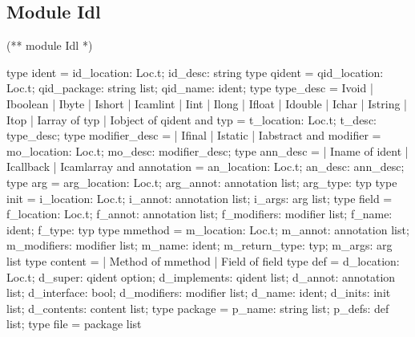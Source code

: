 \documentclass[a4paper, 11pt]{report}
\begin{document}
\subsection*{Module Idl}
\begin{multicols}{2}
\begin{OCaml}
(**  module Idl  *)

type ident = {
    id_location: Loc.t;
    id_desc: string 
  }
type qident = {
    qid_location: Loc.t;
    qid_package: string list;
    qid_name: ident;
  }
type type_desc = 
    Ivoid  
  | Iboolean
  | Ibyte
  | Ishort
  | Icamlint
  | Iint
  | Ilong
  | Ifloat
  | Idouble
  | Ichar
  | Istring
  | Itop
  | Iarray of typ
  | Iobject of qident
and typ = {
    t_location: Loc.t;
    t_desc: type_desc;
  }
type modifier_desc = 
  | Ifinal 
  | Istatic 
  | Iabstract
and modifier = {
    mo_location: Loc.t; 
    mo_desc: modifier_desc;
}
type ann_desc =
  | Iname of ident
  | Icallback
  | Icamlarray
and annotation = {
    an_location: Loc.t; 
    an_desc: ann_desc;
}
type arg = {
    arg_location: Loc.t; 
    arg_annot: annotation list;
    arg_type: typ
}   
type init = {
    i_location: Loc.t;
    i_annot: annotation list; 
    i_args: arg list;
}   
type field = {
    f_location: Loc.t;
    f_annot: annotation list; 
    f_modifiers: modifier list;
    f_name: ident;
    f_type: typ
}
type mmethod = { 
    m_location: Loc.t;
    m_annot: annotation list;
    m_modifiers: modifier list;
    m_name: ident;
    m_return_type: typ;
    m_args: arg list
}
type content = 
    | Method of mmethod 
    | Field of field
type def = {
    d_location: Loc.t;
    d_super: qident option;
    d_implements: qident list;
    d_annot: annotation list;
    d_interface: bool;
    d_modifiers: modifier list;
    d_name: ident;
    d_inits: init list;
    d_contents: content list;
}
type package = {
    p_name: string list;
    p_defs: def list;
}   
type file = package list
 
\end{OCaml}
\end{multicols}
\newpage
\end{document}
